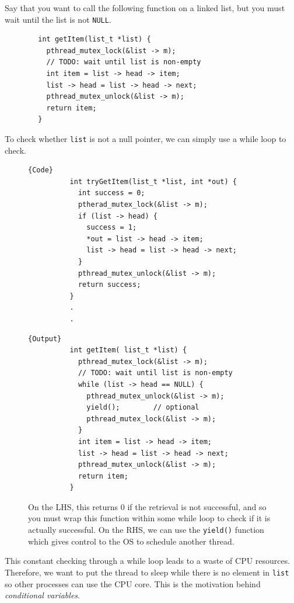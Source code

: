 \documentclass{article}
\begin{document}
    \begin{example}
      Say that you want to call the following function on a linked list, but you must wait until the list is not \texttt{NULL}. 
      \begin{lstlisting}
        int getItem(list_t *list) {
          pthread_mutex_lock(&list -> m); 
          // TODO: wait until list is non-empty
          int item = list -> head -> item; 
          list -> head = list -> head -> next; 
          pthread_mutex_unlock(&list -> m);  
          return item; 
        }
      \end{lstlisting}

      To check whether \texttt{list} is not a null pointer, we can simply use a while loop to check. 

      \begin{figure}[H]
        \centering 
        \noindent\begin{minipage}{.5\textwidth}
        \begin{lstlisting}[]{Code}
          int tryGetItem(list_t *list, int *out) {
            int success = 0; 
            ptherad_mutex_lock(&list -> m); 
            if (list -> head) {
              success = 1; 
              *out = list -> head -> item;
              list -> head = list -> head -> next; 
            }
            pthread_mutex_unlock(&list -> m); 
            return success; 
          }
          .
          .
        \end{lstlisting}
        \end{minipage}
        \hfill
        \begin{minipage}{.49\textwidth}
        \begin{lstlisting}[]{Output}
          int getItem( list_t *list) {
            pthread_mutex_lock(&list -> m); 
            // TODO: wait until list is non-empty 
            while (list -> head == NULL) {
              pthread_mutex_unlock(&list -> m); 
              yield();        // optional 
              pthread_mutex_lock(&list -> m); 
            }
            int item = list -> head -> item; 
            list -> head = list -> head -> next; 
            pthread_mutex_unlock(&list -> m);  
            return item; 
          }
        \end{lstlisting}
        \end{minipage}
        \caption{On the LHS, this returns $0$ if the retrieval is not successful, and so you must wrap this function within some while loop to check if it is actually successful. On the RHS, we can use the \texttt{yield()} function which gives control to the OS to schedule another thread. }
        \label{fig:cpu_waste}
      \end{figure}

      This constant checking through a while loop leads to a waste of CPU resources. Therefore, we want to put the thread to sleep while there is no element in \texttt{list} so other processes can use the CPU core. This is the motivation behind \textit{conditional variables}. 
    \end{example}
\end{document}
